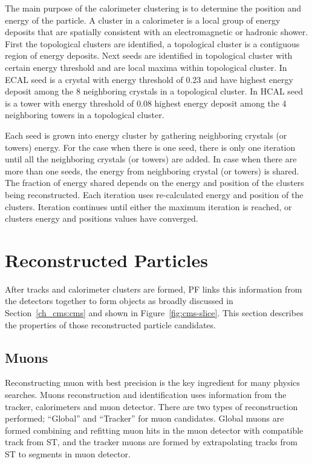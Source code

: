 The main purpose of the calorimeter clustering is to determine the position and
energy of the particle. A cluster in a calorimeter is a local group of
energy deposits that are spatially consistent with an electromagnetic
or hadronic shower. First the topological
clusters are identified, a topological cluster is a contiguous region of energy
deposits. Next seeds are identified in topological cluster with certain energy
threshold and are local maxima within topological cluster.
In \gls{ECAL} seed is a crystal with energy threshold of 0.23 \GeV{}
and have highest energy deposit among the 8 neighboring
crystals in a topological cluster.
In \gls{HCAL} seed is a tower with energy threshold of 0.08 \GeV{} highest
energy deposit among the 4 neighboring towers in a topological cluster.

Each seed is grown into energy cluster by gathering neighboring crystals (or towers)
energy.
For the case when there is one seed, there is only one
iteration until all the neighboring crystals (or towers) are added.
In case when there are more than one seeds,
the energy from neighboring crystal (or towers) is shared.
The fraction of energy shared depends on the energy and position of the
clusters being reconstructed.
Each iteration uses re-calculated energy and position of the clusters.
Iteration continues until either
the maximum iteration is reached, or clusters
energy and positions values have converged.

\section{
  Reconstructed Particles
 }

After tracks and calorimeter clusters are formed, \gls{PF} links this information
from the detectors together to form objects as broadly discussed in
Section~\ref{ch_cms:cms} and shown in Figure~\ref{fig:cms-slice}. This section
describes the properties of those reconstructed particle candidates.

\subsection{
  Muons
}

Reconstructing muon with best precision is the key ingredient for many physics
searches. Muons reconstruction and identification uses information from the tracker,
calorimeters and muon detector. There are two types of reconstruction performed;
``Global'' and ``Tracker'' for muon candidates. Global muons are formed combining and refitting
muon hits in the muon detector with compatible track from \gls{ST}, and the tracker muons
are formed by extrapolating tracks from \gls{ST} to segments in muon detector.

